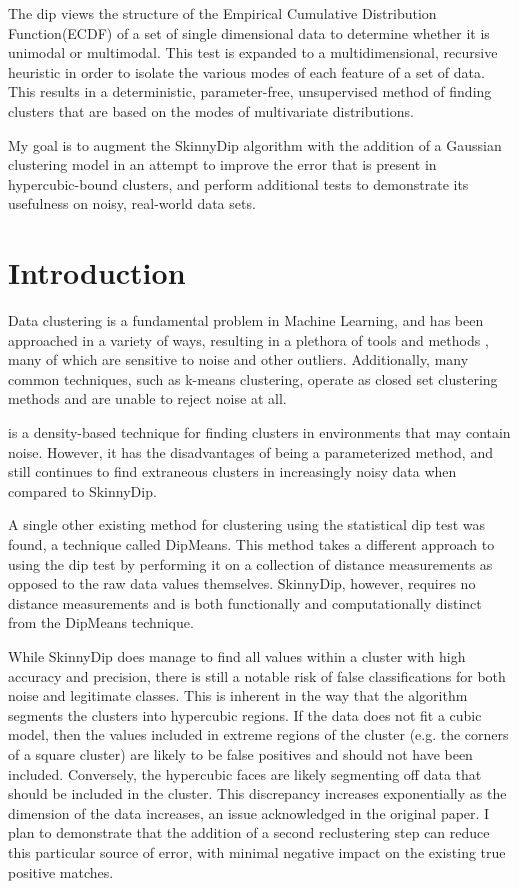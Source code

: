 \documentclass{sig-alternate-05-2015}
\begin{document}
The dip views the structure of the Empirical Cumulative Distribution Function(ECDF) of a set of single dimensional data to determine whether it is unimodal or multimodal. This test is expanded to a multidimensional, recursive heuristic in order to isolate the various modes of each feature of a set of data. This results in a deterministic, parameter-free, unsupervised method of finding clusters that are based on the modes of multivariate distributions. 

My goal is to augment the SkinnyDip algorithm with the addition of a Gaussian clustering model in an attempt to improve the error that is present in hypercubic-bound clusters, and perform additional tests to demonstrate its usefulness on noisy, real-world data sets.


\section{Introduction}
Data clustering is a fundamental problem in Machine Learning, and has been approached in a variety of ways, resulting in a plethora of tools and methods \cite{ClusteringMethods}, many of which are sensitive to noise and other outliers. Additionally, many common techniques, such as k-means clustering, operate as closed set clustering methods and are unable to reject noise at all.

\cite{DBSCAN} is a density-based technique for finding clusters in environments that may contain noise. However, it has the disadvantages of being a parameterized method, and still continues to find extraneous clusters in increasingly noisy data when compared to SkinnyDip.

A single other existing method for clustering using the statistical dip test was found, a technique called DipMeans\cite{dipmeans}. This method takes a different approach to using the dip test by performing it on a collection of distance measurements as opposed to the raw data values themselves. SkinnyDip, however, requires no distance measurements  and is both functionally and computationally distinct from the DipMeans technique.

While SkinnyDip does manage to find all values within a cluster with high accuracy and precision, there is still a notable risk of false classifications for both noise and legitimate classes. This is inherent in the way that the algorithm segments the clusters into hypercubic regions. If the data does not fit a cubic model, then the values included in extreme regions of the cluster (e.g. the corners of a square cluster) are likely to be false positives and should not have been included. Conversely, the hypercubic faces are likely segmenting off data that should be included in the cluster.  This discrepancy increases exponentially as the dimension of the data increases, an issue acknowledged in the original paper\cite{skinnydip}. I plan to demonstrate that the addition of a second reclustering step can reduce this particular source of error, with minimal negative impact on the existing true positive matches.
\end{document}
